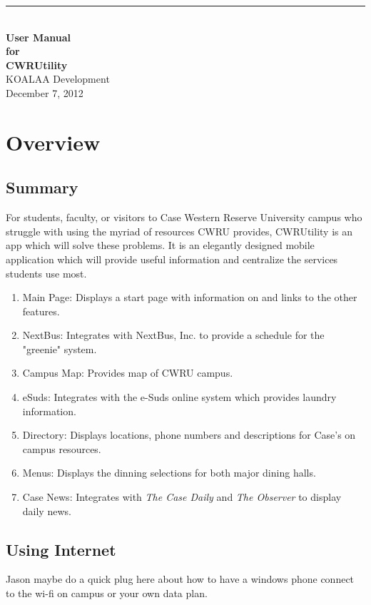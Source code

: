 \documentclass[pdftex,12pt,letter]{article}
\newcommand{\HRule}{\rule{\linewidth}{0.5mm}}
\begin{document}
\begin{titlepage}
\begin{flushright}
\HRule \\[0.4cm]
{ \bfseries
{\huge  User Manual\\[1cm]}
{\Large for\\[1cm]}
{\huge CWRUtility\large}\\[4cm]}
{\large KOALAA Development\\[1cm]December 7, 2012}
\end{flushright}
\end{titlepage}
\tableofcontents{}

\newpage
\section{Overview}
\subsection{Summary}
For students, faculty, or visitors to Case Western Reserve University campus who struggle with using the myriad of resources CWRU provides, CWRUtility is an app which will solve these problems. It is an elegantly designed mobile application which will provide useful information and centralize the services students use most.
\begin{enumerate}[FE-1:]
\item Main Page: Displays a start page with information on and links to the other features.
\item NextBus: Integrates with NextBus, Inc. to provide a schedule for the "greenie" system.
\item Campus Map: Provides map of CWRU campus.
\item eSuds: Integrates with the e-Suds online system which provides laundry information.
\item Directory: Displays locations, phone numbers and descriptions for Case's on campus resources.
\item Menus: Displays the dinning selections for both major dining halls.
\item Case News: Integrates with \emph{The Case Daily} and \emph{The Observer} to display daily news.
\end{enumerate} 
\subsection{Using Internet}
Jason maybe do a quick plug here about how to have a windows phone connect to the wi-fi on campus or your own data plan.
\end{document}
